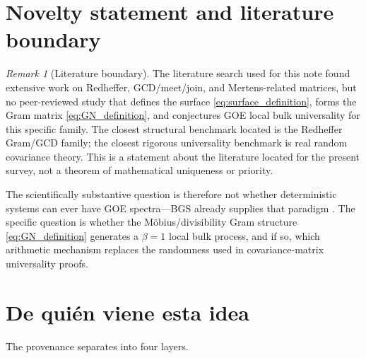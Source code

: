 \documentclass[11pt]{amsart}
\numberwithin{equation}{section}
\theoremstyle{plain}
\theoremstyle{definition}
\theoremstyle{remark}
\newtheorem{remark}[theorem]{Remark}
\begin{document}
\section{Novelty statement and literature boundary}
\label{sec:novelty_boundary}

\begin{remark}[Literature boundary]
\label{rem:literature_boundary}
The literature search used for this note found extensive work on Redheffer, GCD/meet/join, and Mertens-related matrices, but no peer-reviewed study that defines the surface \eqref{eq:surface_definition}, forms the Gram matrix \eqref{eq:GN_definition}, and conjectures GOE local bulk universality for this specific family.  The closest structural benchmark located is the Redheffer Gram/GCD family; the closest rigorous universality benchmark is real random covariance theory.  This is a statement about the literature located for the present survey, not a theorem of mathematical uniqueness or priority.
\end{remark}

The scientifically substantive question is therefore not whether deterministic systems can ever have GOE spectra---BGS already supplies that paradigm \cite{BGS1984}.  The specific question is whether the M\"obius/divisibility Gram structure \eqref{eq:GN_definition} generates a $\beta=1$ local bulk process, and if so, which arithmetic mechanism replaces the randomness used in covariance-matrix universality proofs.

\section{De qui\'en viene esta idea}
\label{sec:provenance}

The provenance separates into four layers.
\end{document}
